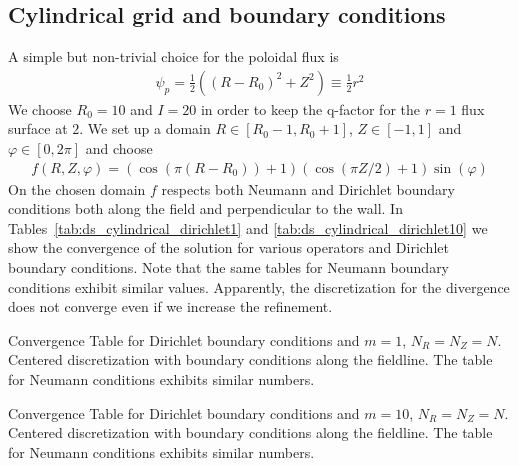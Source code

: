 \subsection{Cylindrical grid and boundary conditions}
A simple but non-trivial choice for the poloidal flux is
\begin{align}
  \psi_p = \frac{1}{2} \left( (R-R_0)^2 + Z^2 \right) \equiv \frac{1}{2} r^2
  \label{eq:circular}
\end{align}
We choose $R_0 = 10$ and $I=20$ in order to keep the q-factor for the $r=1$ flux surface at $2$.
We set up a domain
$R\in[R_0-1, R_0+1]$,
$Z\in[-1,1]$ and
$\varphi \in [0,2\pi]$ and choose
\begin{align}
    f(R,Z,\varphi) = (\cos(\pi (R-R_0))+1)( \cos(\pi Z /2)+1)\sin(\varphi)
  \label{}
\end{align}
On the chosen domain $f$ respects both Neumann and Dirichlet boundary conditions
both along the field and perpendicular to the wall.
In Tables~\ref{tab:ds_cylindrical_dirichlet1} and
\ref{tab:ds_cylindrical_dirichlet10} we show the convergence of the solution
for various operators and Dirichlet boundary conditions. Note that the same
tables for Neumann boundary conditions exhibit similar values.
Apparently, the discretization for the divergence does not converge even if we
increase the refinement.

\begin{table*}[ht]
\begin{centering}
\footnotesize
\hspace*{-2cm}

\caption{Convergence Table for Dirichlet boundary conditions and $m=1$,
$N_R=N_Z=N$. Centered discretization with boundary conditions along the fieldline. The table for Neumann conditions exhibits similar numbers.}
\label{tab:ds_cylindrical_dirichlet1}
\end{centering}
\end{table*}

\begin{table*}[ht]
\begin{centering}
\footnotesize
\hspace*{-2cm}

\caption{Convergence Table for Dirichlet boundary conditions and $m=10$,
$N_R=N_Z=N$. Centered discretization with boundary conditions along the fieldline. The table for Neumann conditions exhibits similar numbers.}
\label{tab:ds_cylindrical_dirichlet10}
\end{centering}
\end{table*}

